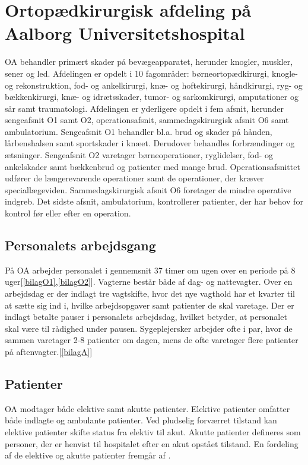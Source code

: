 \section{Ortopædkirurgisk afdeling på Aalborg Universitetshospital}
OA behandler primært skader på bevægeapparatet, herunder knogler, muskler, sener og led. Afdelingen er opdelt i 10 fagområder: børneortopædkirurgi, knogle- og rekonstruktion, fod- og ankelkirurgi, knæ- og hoftekirurgi, håndkirurgi, ryg- og bækkenkirurgi, knæ- og idrætsskader, tumor- og sarkomkirurgi, amputationer og sår samt traumatologi. Afdelingen er yderligere opdelt i fem afsnit, herunder sengeafsnit O1 samt O2, operationsafsnit, sammedagskirurgisk afsnit O6 samt ambulatorium. 
Sengeafsnit O1 behandler bl.a. brud og skader på hånden, lårbenshalsen samt sportskader i knæet. Derudover behandles forbrændinger og ætsninger. Sengeafsnit O2 varetager børneoperationer, ryglidelser, fod- og ankelskader samt bækkenbrud og patienter med mange brud. Operationsafsnittet udfører de længerevarende operationer samt de operationer, der kræver speciallægeviden. Sammedagskirurgisk afsnit O6 foretager de mindre operative indgreb. Det sidste afsnit, ambulatorium, kontrollerer patienter, der har behov for kontrol før eller efter en operation.\cite{Aalborg2016}

\subsection{Personalets arbejdsgang}
På OA arbejder personalet i gennemsnit 37 timer om ugen over en periode på 8 uger\cite{Danske2015}[\ref{bilagO1},\ref{bilagO2}]. Vagterne består både af dag- og nattevagter. Over en arbejdsdag er der indlagt tre vagtskifte, hvor det nye vagthold har et kvarter til at sætte sig ind i, hvilke arbejdsopgaver samt patienter de skal varetage. Der er indlagt betalte pauser i personalets arbejdsdag, hvilket betyder, at personalet skal være til rådighed under pausen. Sygeplejersker arbejder ofte i par, hvor de sammen varetager 2-8 patienter om dagen, mens de ofte varetager flere patienter på aftenvagter.[\ref{bilagA}]

\subsection{Patienter}
OA modtager både elektive samt akutte patienter. Elektive patienter omfatter både indlagte og ambulante patienter. Ved pludselig forværret tilstand kan elektive patienter skifte status fra elektiv til akut. Akutte patienter defineres som personer, der er henvist til hospitalet efter en akut opstået tilstand.\cite{RegionNord2016} En fordeling af de elektive og akutte patienter fremgår af .


